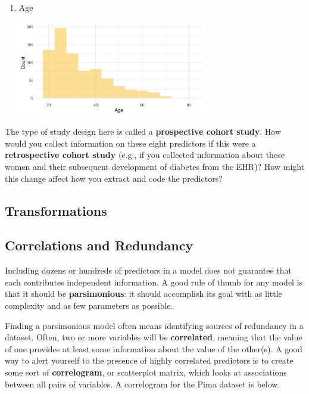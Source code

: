 \begin{question}{}
\begin{enumerate}
\begin{center}
    \end{center}
    \newpage
  \item Age
    \begin{center}
    \includegraphics[width=0.65\textwidth]{img/pima-age.png}
    \end{center}
  \end{enumerate}
\end{question}

\begin{question}{}
The type of study design here is called a \textbf{prospective cohort study}. How would you collect information on these eight predictors if this were a \textbf{retrospective cohort study} (e.g., if you collected information about these women and their subsequent development of diabetes from the EHR)? How might this change affect how you extract and code the predictors? 
\end{question}

\subsection{Transformations}



\subsection{Correlations and Redundancy \label{section:redund}}

Including dozens or hundreds of predictors in a model does not guarantee that each contributes independent information. A good rule of thumb for any model is that it should be \textbf{parsimonious}: it should accomplish its goal with as little complexity and as few parameters as possible.

Finding a parsimonious model often means identifying sources of redundancy in a dataset. Often, two or more variables will be \textbf{correlated}, meaning that the value of one provides at least some information about the value of the other(s). A good way to alert yourself to the presence of highly correlated predictors is to create some sort of \textbf{correlogram}, or scatterplot matrix, which looks at associations between all pairs of variables. A correlogram for the Pima dataset is below.

